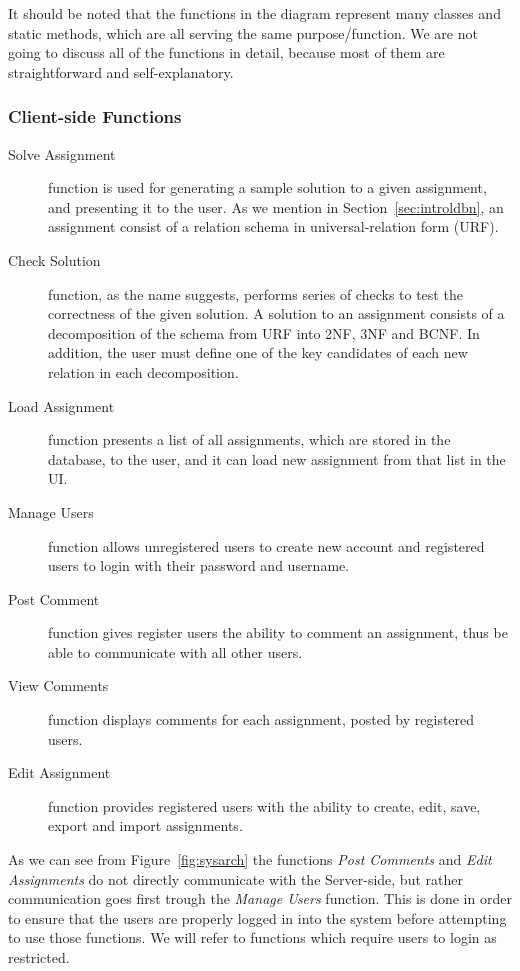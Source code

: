 It should be noted that the functions in the diagram represent many classes and 
static methods, which are all serving the same purpose/function. We are not 
going to discuss all 
of the functions in detail, because most of them are straightforward and 
self-explanatory. 

\subsubsection{Client-side Functions}

\begin{description}
	\item[Solve Assignment] function is used for generating a sample solution to 
		a given assignment, and presenting it to the user. As we mention in 
		Section~\ref{sec:introldbn}, an assignment consist of a relation schema in universal-relation form (URF).
	\item[Check Solution] function, as the name suggests, performs series of checks to 
		test the correctness of the given solution. A solution to an assignment consists 
		of a decomposition of the schema from URF into 2NF, 3NF and BCNF. In addition,
		the user must define one of the key candidates of each new relation in each
		decomposition. 
	\item[Load Assignment] function presents a list of all assignments, which are 
		stored in the database, to the user, and it can load new assignment from that list
		in the UI.
	\item[Manage Users] function allows unregistered users to create new account 
		and registered users to login with their password and username. 
	\item[Post Comment] function gives register users the ability to comment an assignment, 
		thus be able to communicate with all other users.
	\item[View Comments] function displays comments for each assignment, posted by registered users.
	\item[Edit Assignment] function provides registered users with the 
		ability to create, edit, save, export and import assignments. 
\end{description}

As we can see from Figure~\ref{fig:sysarch} the functions \textit{Post Comments} 
and \textit{Edit Assignments} do not directly communicate with the Server-side, but rather 
communication goes first trough the \textit{Manage Users} function. This is done in order 
to ensure that the users are properly logged in into the system before attempting 
to use those functions. We will refer to functions which require users to login as restricted. 

